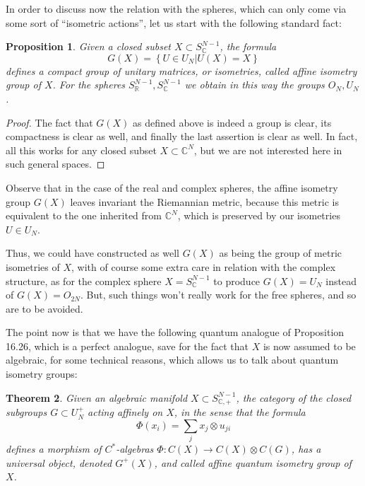 \documentclass[12pt]{amsbook}
\newtheorem{theorem}{Theorem}[chapter]
\newtheorem{proposition}[theorem]{Proposition}
\begin{document}
In order to discuss now the relation with the spheres, which can only come via some sort of ``isometric actions'', let us start with the following standard fact:

\begin{proposition}
Given a closed subset $X\subset S^{N-1}_\mathbb C$, the formula
$$G(X)=\left\{U\in U_N\Big|U(X)=X\right\}$$
defines a compact group of unitary matrices, or isometries, called affine isometry group of $X$. For the spheres $S^{N-1}_\mathbb R,S^{N-1}_\mathbb C$ we obtain in this way the groups $O_N,U_N$.
\end{proposition}

\begin{proof}
The fact that $G(X)$ as defined above is indeed a group is clear, its compactness is clear as well, and finally the last assertion is clear as well. In fact, all this works for any closed subset $X\subset\mathbb C^N$, but we are not interested here in such general spaces.
\end{proof}

Observe that in the case of the real and complex spheres, the affine isometry group $G(X)$ leaves invariant the Riemannian metric, because this metric is equivalent to the one inherited from $\mathbb C^N$, which is preserved by our isometries $U\in U_N$. 

\bigskip

Thus, we could have constructed as well $G(X)$ as being the group of metric isometries of $X$, with of course some extra care in relation with the complex structure, as for the complex sphere $X=S^{N-1}_\mathbb C$ to produce $G(X)=U_N$ instead of $G(X)=O_{2N}$. But, such things won't really work for the free spheres, and so are to be avoided. 

\bigskip

The point now is that we have the following quantum analogue of Proposition 16.26, which is a perfect analogue, save for the fact that $X$ is now assumed to be algebraic, for some technical reasons, which allows us to talk about quantum isometry groups:

\begin{theorem}
Given an algebraic manifold $X\subset S^{N-1}_{\mathbb C,+}$, the category of the closed subgroups $G\subset U_N^+$ acting affinely on $X$, in the sense that the formula
$$\Phi(x_i)=\sum_jx_j\otimes u_{ji}$$ 
defines a morphism of $C^*$-algebras $\Phi:C(X)\to C(X)\otimes C(G)$, has a universal object, denoted $G^+(X)$, and called affine quantum isometry group of $X$.
\end{theorem}
\end{document}
